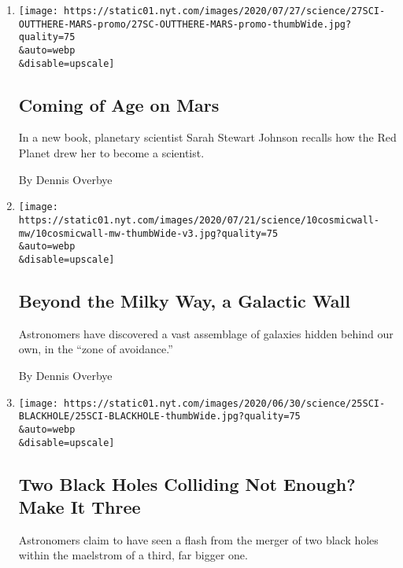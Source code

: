 \begin{enumerate}
\def\labelenumi{\arabic{enumi}.}
\item
  \href{/2020/07/27/science/mars-sarah-stewart-johnson.html}{}

  \texttt{[image: https://static01.nyt.com/images/2020/07/27/science/27SCI-OUTTHERE-MARS-promo/27SC-OUTTHERE-MARS-promo-thumbWide.jpg?quality=75\\\&auto=webp\\\&disable=upscale]}

  \hypertarget{coming-of-age-on-mars}{%
  \subsection{Coming of Age on Mars}\label{coming-of-age-on-mars}}

  In a new book, planetary scientist Sarah Stewart Johnson recalls how
  the Red Planet drew her to become a scientist.

  By Dennis Overbye
\item
  \href{/2020/07/10/science/astronomy-galaxies-attractor-universe.html}{}

  \texttt{[image: https://static01.nyt.com/images/2020/07/21/science/10cosmicwall-mw/10cosmicwall-mw-thumbWide-v3.jpg?quality=75\\\&auto=webp\\\&disable=upscale]}

  \hypertarget{beyond-the-milky-way-a-galactic-wall}{%
  \subsection{Beyond the Milky Way, a Galactic
  Wall}\label{beyond-the-milky-way-a-galactic-wall}}

  Astronomers have discovered a vast assemblage of galaxies hidden
  behind our own, in the ``zone of avoidance.''

  By Dennis Overbye
\item
  \href{/2020/06/25/science/black-hole-collision-ligo.html}{}

  \texttt{[image: https://static01.nyt.com/images/2020/06/30/science/25SCI-BLACKHOLE/25SCI-BLACKHOLE-thumbWide.jpg?quality=75\\\&auto=webp\\\&disable=upscale]}

  \hypertarget{two-black-holes-colliding-not-enough-make-it-three}{%
  \subsection{Two Black Holes Colliding Not Enough? Make It
  Three}\label{two-black-holes-colliding-not-enough-make-it-three}}

  Astronomers claim to have seen a flash from the merger of two black
  holes within the maelstrom of a third, far bigger one.


\end{enumerate}

